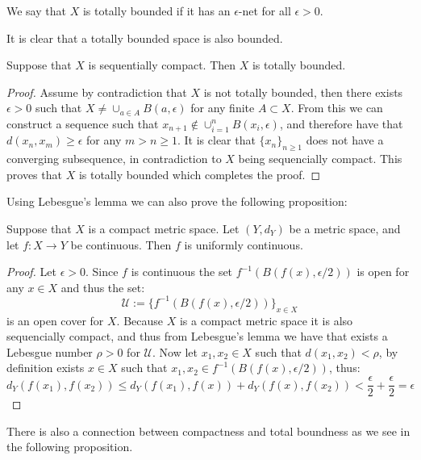 \documentclass[11pt,a4paper]{article}
\begin{document}
\begin{definition}
  We say that $X$ is totally bounded if it has an $\epsilon$-net 
  for all $\epsilon > 0$.
\end{definition}

It is clear that a totally bounded space is also bounded. 

\begin{proposition}
  Suppose that $X$ is sequentially compact. Then $X$ is totally bounded.
\end{proposition}
\begin{proof}
  Assume by contradiction that $X$ is not totally bounded, then there exists
  $\epsilon > 0$ such that $X \neq \cup_{a \in A} B(a,\epsilon)$ for any
  finite $A \subset X$. From this we can construct a sequence such that
  $x_{n+1} \notin \cup_{i=1}^{n} B(x_i,\epsilon)$, and therefore have
  that $d(x_n,x_m) \geq \epsilon$ for any $m > n \geq 1$. It is clear
  that $\{x_n\}_{n \geq 1}$ does not have a converging subsequence,
  in contradiction to $X$ being sequencially compact. This proves that
  $X$ is totally bounded which completes the proof.
\end{proof}

Using Lebesgue's lemma we can also prove the following proposition:

\begin{proposition}
  Suppose that $X$ is a compact metric space. Let $(Y, d_Y)$ be a 
  metric space, and let $f \colon X \to Y$ be continuous. Then $f$ is 
  uniformly continuous.	
\end{proposition}
\begin{proof}
  Let $\epsilon > 0$. Since $f$ is continuous the set 
  $f^{-1}(B(f(x),\epsilon/2))$ is open for any $x \in X$ and thus
  the set:
  \[
    \mathcal{U} := \{f^{-1}(B(f(x),\epsilon/2))\}_{x \in X}
  \]
  is an open cover for $X$. Because $X$ is a compact metric space
  it is also sequencially compact, and thus from Lebesgue's lemma
  we have that exists a Lebesgue number $\rho > 0$ for $\mathcal{U}$.
  Now let $x_1,x_2 \in X$ such that $d(x_1,x_2) < \rho$, by definition
  exists $x \in X$ such that $x_1,x_2 \in f^{-1}(B(f(x),\epsilon/2))$,
  thus:
  \[
    d_Y(f(x_1),f(x_2)) \le d_Y(f(x_1),f(x)) + d_Y(f(x),f(x_2)) <
    \frac{\epsilon}{2} + \frac{\epsilon}{2} = \epsilon
  \]
\end{proof}

There is also a connection between compactness and total boundness as
we see in the following proposition.
\end{document}
